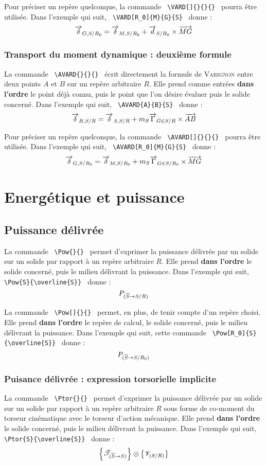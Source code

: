 \documentclass[12pt]{article}
\begin{document}
Pour préciser un repère quelconque, la commande \verb| \VARD[]{}{}{} | pourra être utilisée. Dans l'exemple qui suit, \verb| \VARD[R_0]{M}{G}{S} | donne : $$\VARD[R_0]{M}{G}{S}$$

\subsubsection{Transport du moment dynamique : deuxième formule}
La commande \verb| \AVARD{}{}{} | écrit directement la formule de \textsc{Varignon} entre deux points $A$ et $B$ sur un repère arbitraire $R$. Elle prend comme entrées \textbf{dans l'ordre} le point déjà connu, puis le point que l'on désire évaluer puis le solide concerné. Dans l'exemple qui suit, \verb| \AVARD{A}{B}{S} | donne : $$\AVARD{A}{B}{S}$$

Pour préciser un repère quelconque, la commande \verb| \AVARD[]{}{}{} | pourra être utilisée. Dans l'exemple qui suit, \verb| \AVARD[R_0]{M}{G}{S} | donne : $$\AVARD[R_0]{M}{G}{S}$$

\newpage

\section{Energétique et puissance}

\subsection{Puissance délivrée}
La commande \verb| \Pow{}{} | permet d'exprimer la puissance délivrée par un solide sur un solide par rapport à un repère arbitraire $R$. Elle prend \textbf{dans l'ordre} le solide concerné, puis le milieu délivrant la puissance. Dans l'exemple qui suit, \verb| \Pow{S}{\overline{S}} | donne : $$\Pow{S}{\overline{S}}$$

La commande \verb| \Pow[]{}{} | permet, en plus, de tenir compte d'un repère choisi. Elle prend \textbf{dans l'ordre} le repère de calcul, le solide concerné, puis le milieu délivrant la puissance. Dans l'exemple qui suit, cette commande \verb| \Pow[R_0]{S}{\overline{S}} | donne : $$\Pow[R_0]{S}{\overline{S}}$$

\subsubsection{Puisance délivrée : expression torsorielle implicite}
La commande \verb| \Ptor{}{} | permet d'exprimer la puissance délivrée par un solide sur un solide par rapport à un repère arbitraire $R$ sous forme de co-moment du torseur cinématique avec le torseur d'action mécanique. Elle prend \textbf{dans l'ordre} le solide concerné, puis le milieu délivrant la puissance. Dans l'exemple qui suit, \verb| \Ptor{S}{\overline{S}} | donne : $$\Ptor{S}{\overline{S}}$$
\end{document}
